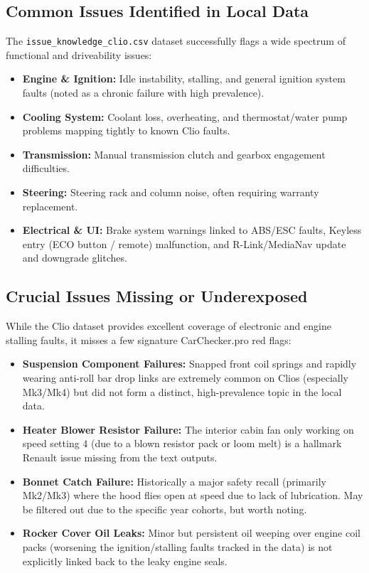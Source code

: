 \documentclass[11pt,a4paper]{article}
\begin{document}
\subsection{Common Issues Identified in Local Data}
The \texttt{issue\_knowledge\_clio.csv} dataset successfully flags a wide spectrum of functional and driveability issues:
\begin{itemize}
    \item \textbf{Engine \& Ignition:} Idle instability, stalling, and general ignition system faults (noted as a chronic failure with high prevalence).
    \item \textbf{Cooling System:} Coolant loss, overheating, and thermostat/water pump problems mapping tightly to known Clio faults.
    \item \textbf{Transmission:} Manual transmission clutch and gearbox engagement difficulties.
    \item \textbf{Steering:} Steering rack and column noise, often requiring warranty replacement.
    \item \textbf{Electrical \& UI:} Brake system warnings linked to ABS/ESC faults, Keyless entry (ECO button / remote) malfunction, and R-Link/MediaNav update and downgrade glitches.
\end{itemize}

\subsection{Crucial Issues Missing or Underexposed}
While the Clio dataset provides excellent coverage of electronic and engine stalling faults, it misses a few signature CarChecker.pro red flags:
\begin{itemize}
    \item \textbf{Suspension Component Failures:} Snapped front coil springs and rapidly wearing anti-roll bar drop links are extremely common on Clios (especially Mk3/Mk4) but did not form a distinct, high-prevalence topic in the local data.
    \item \textbf{Heater Blower Resistor Failure:} The interior cabin fan only working on speed setting 4 (due to a blown resistor pack or loom melt) is a hallmark Renault issue missing from the text outputs.
    \item \textbf{Bonnet Catch Failure:} Historically a major safety recall (primarily Mk2/Mk3) where the hood flies open at speed due to lack of lubrication. May be filtered out due to the specific year cohorts, but worth noting.
    \item \textbf{Rocker Cover Oil Leaks:} Minor but persistent oil weeping over engine coil packs (worsening the ignition/stalling faults tracked in the data) is not explicitly linked back to the leaky engine seals.
\end{itemize}
\end{document}
